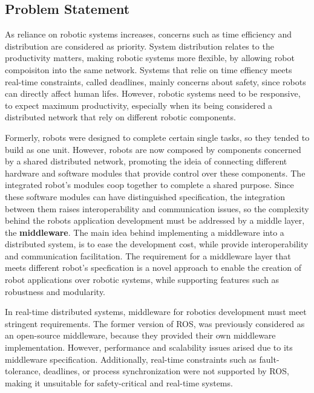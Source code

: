 \subsection{Problem Statement}\label{s:problem}

As reliance on robotic systems increases,  
concerns such as time efficiency and distribution are considered as priority. %
System distribution relates to the productivity matters, making robotic systems more flexible, by allowing robot compoisiton into the same network. Systems that relie on time effiency meets real-time constraints, called deadlines, mainly concerns about safety, since robots can directly affect human lifes. However, robotic systems need to be responsive, to expect maximum productivity, especially when its being considered a distributed network that rely on different robotic components. 

Formerly, robots were designed to complete certain single tasks, so they tended to build as one unit. However, robots are now composed by components concerned by a shared distributed network, promoting the ideia of connecting different hardware and software modules that provide control over these components. The integrated robot's modules coop together to complete a shared purpose. Since these software modules can have distinguished specification, the integration between them raises interoperability and communication issues, so the complexity behind the robots application development must be addressed by a middle layer, the \textbf{middleware}. The main idea behind implementing a middleware into a distributed system, is to ease the development cost, while provide interoperability and communication facilitation. \cite{mohamed2008middleware} The requirement for a middleware layer that meets different robot's specfication is a novel approach to enable the creation of robot applications over robotic systems, while supporting features such as robustness and modularity. 

In real-time distributed systems, middleware for robotics development must meet stringent requirements. \cite{maruyama2016exploring} The former version of ROS, was previously considered as an open-source middleware, because they provided their own middleware implementation. However, performance and scalability issues arised due to its middleware specification. \cite{intro-ros} Additionally, real-time constraints such as fault-tolerance, deadlines, or process synchronization were not supported by ROS, making it unsuitable for safety-critical and real-time systems. \cite{kim2018security} 

